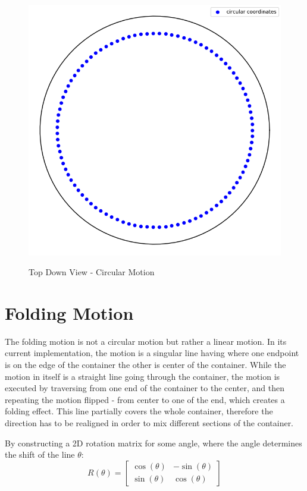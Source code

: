 \begin{figure}[H]
    \includegraphics[scale=0.35]{Graphics/motions/circular_motion.png}
    \centering
    \label{fig:circularMotion}
    \caption{Top Down View - Circular Motion}
\end{figure}

\section{Folding Motion}
The folding motion is not a circular motion but rather a linear motion. In its current implementation, the motion is a singular line having where one endpoint is on the edge of the container
the other is center of the container. While the motion in itself is a straight line going through the container, the motion is executed by traversing from one end of the container to the center,
and then repeating the motion flipped - from center to one of the end, which creates a folding effect.
This line partially covers the whole container, therefore the direction has to be realigned in order to mix different sections of the container.

By constructing a 2D rotation matrix for some angle, where the angle determines the shift of the line $\theta$:
\[R(\theta) = \begin{bmatrix}
    \cos(\theta) & -\sin(\theta) \\
    \sin(\theta) & \cos(\theta)
     \end{bmatrix}
 \] 

